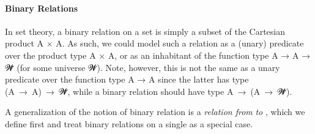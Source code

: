 \paragraph*{Binary Relations} %
In set theory, a binary relation on a set  is simply a subset of the Cartesian product \ab A × \ab A. As such, we could model such a relation as a (unary) predicate over the product type \ab A \af × \ab A, or as an inhabitant of the function type \ab A \as → \ab A \as → \ab 𝓦\af ̇ (for some universe \ab 𝓦).  Note, however, this is not the same as a unary predicate over the function type \ab A \as → \ab A since the latter has type  (\ab A~\as →~\ab A)~\as →~\ab 𝓦\af ̇, while a binary relation should have type \ab A~\as →~(\ab A~\as →~\ab 𝓦\af ̇). 

A generalization of the notion of binary relation is a \emph{relation from}  \emph{to} , which we define first and treat binary relations on a single  as a special case.
\ccpad
\begin{code}
\>[1]\AgdaSpace{}%
\AgdaSymbol{:}\AgdaSpace{}%
%
\AgdaSpace{}%
\AgdaSpace{}%
%
\AgdaSpace{}%
\AgdaSpace{}%
\AgdaSymbol{(}\AgdaSpace{}%
\AgdaSymbol{:}\AgdaSpace{}%
\AgdaSymbol{)}\AgdaSpace{}%
\AgdaSpace{}%
\AgdaSpace{}%
\AgdaSpace{}%
\AgdaSpace{}%
\AgdaSpace{}%
\AgdaSpace{}%
\AgdaSpace{}%
\<%
\\
%
\>[1]\AgdaSpace{}%
\AgdaSpace{}%
\AgdaSpace{}%
\AgdaSpace{}%
\AgdaSymbol{=}\AgdaSpace{}%
\AgdaSpace{}%
\AgdaSpace{}%
\AgdaSpace{}%
\AgdaSpace{}%
%
\<%
\\
%
\\[\AgdaEmptyExtraSkip]%
%
\>[1]\AgdaSpace{}%
\AgdaSymbol{:}\AgdaSpace{}%
%
\AgdaSpace{}%
\AgdaSpace{}%
\AgdaSymbol{(}\AgdaSpace{}%
\AgdaSymbol{:}\AgdaSpace{}%
\AgdaSymbol{)}\AgdaSpace{}%
\AgdaSpace{}%
\AgdaSpace{}%
\AgdaSpace{}%
\AgdaSpace{}%
%
\<%
\\
%
\>[1]\AgdaSpace{}%
\AgdaSpace{}%
\AgdaSpace{}%
\AgdaSymbol{=}\AgdaSpace{}%
\AgdaSpace{}%
\AgdaSpace{}%
\AgdaSpace{}%
\<%
\end{code}

